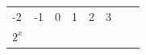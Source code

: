 {\begin{center}
\begin{xtabular*}{\mytablewidth}[t]{|p{10\mystarwidth}|p{10\mystarwidth}|p{10\mystarwidth}|p{10\mystarwidth}|p{10\mystarwidth}|p{10\mystarwidth}|p{10\mystarwidth}|p{10\mystarwidth}|}
        -2 &
    
    
        -1 &
    
    
        0 &
    
    
        1 &
    
    
        2 &
    
    
        3%
     \tabularnewline{}
    
    
        
                \begin{math}{2}^{x}\end{math}
               &
    
    
         &
    
    

\end{xtabular*}
\end{center}}
